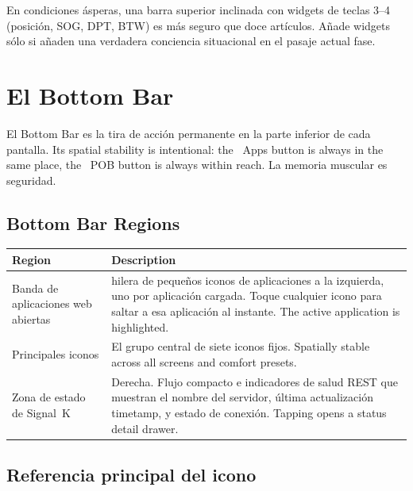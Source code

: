 \begin{tipbox}
En condiciones ásperas, una barra superior inclinada con widgets de teclas 3--4 (posición, SOG, DPT, BTW)
es más seguro que doce artículos.
Añade widgets sólo si añaden una verdadera conciencia situacional en el pasaje actual
fase.
\end{tipbox}

\chapter{El Bottom Bar}
\label{ch:bottombar}

El Bottom Bar es la tira de acción permanente en la parte inferior de cada pantalla.
Its spatial stability is intentional: the ~Apps button is always
in the same place, the ~POB button is always within reach.
La memoria muscular es seguridad.


\section{Bottom Bar Regions}

\begin{longtable}{L{3.6cm}L{10.1cm}}
\toprule
{}
\color{white}\sffamily\bfseries Region &
\color{white}\sffamily\bfseries Description \\
\midrule
Banda de aplicaciones web abiertas&
hilera de pequeños iconos de aplicaciones a la izquierda, uno por aplicación cargada.
Toque cualquier icono para saltar a esa aplicación al instante.
  The active application is highlighted. \\
Principales iconos&
El grupo central de siete iconos fijos.
  Spatially stable across all screens and comfort presets. \\
Zona de estado de Signal~K&
Derecha. Flujo compacto e indicadores de salud REST que muestran el nombre del servidor,
última actualización timetamp, y estado de conexión.
  Tapping opens a status detail drawer. \\
\bottomrule
\end{longtable}

\section{Referencia principal del icono}

